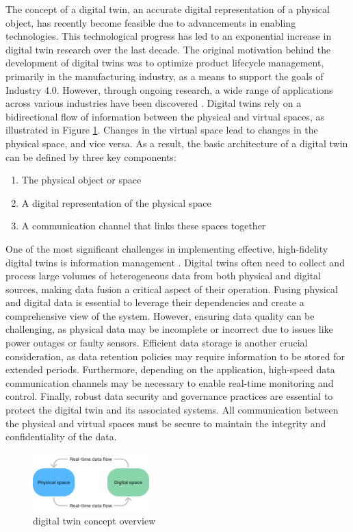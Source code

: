 \documentclass[conference]{IEEEtran}
\begin{document}
The concept of a digital twin, an accurate digital representation of a physical object, has recently become feasible due to advancements in enabling technologies. This technological progress has led to an exponential increase in digital twin research over the last decade. The original motivation behind the development of digital twins was to optimize product lifecycle management, primarily in the manufacturing industry, as a means to support the goals of Industry 4.0. However, through ongoing research, a wide range of applications across various industries have been discovered \cite{mihai_digital_2022} \cite{singh_applications_2022} \cite{b_heluany_survey_2023}.
Digital twins rely on a bidirectional flow of information between the physical and virtual spaces, as illustrated in Figure \ref{fig:digital_twin}. Changes in the virtual space lead to changes in the physical space, and vice versa. As a result, the basic architecture of a digital twin can be defined by three key components:
\begin{enumerate}
    \item The physical object or space
    \item A digital representation of the physical space
    \item A communication channel that links these spaces together
\end{enumerate}

One of the most significant challenges in implementing effective, high-fidelity digital twins is information management \cite{xiong_digital_2022} \cite{boyes_digital_2022}. Digital twins often need to collect and process large volumes of heterogeneous data from both physical and digital sources, making data fusion a critical aspect of their operation.
Fusing physical and digital data is essential to leverage their dependencies and create a comprehensive view of the system. However, ensuring data quality can be challenging, as physical data may be incomplete or incorrect due to issues like power outages or faulty sensors. Efficient data storage is another crucial consideration, as data retention policies may require information to be stored for extended periods. Furthermore, depending on the application, high-speed data communication channels may be necessary to enable real-time monitoring and control. Finally, robust data security and governance practices are essential to protect the digital twin and its associated systems. All communication between the physical and virtual spaces must be secure to maintain the integrity and confidentiality of the data.
\begin{figure}[htp]
    \centering
    \includegraphics[width=0.4\textwidth]{digital-twin.png}
    \caption{digital twin concept overview}
    \label{fig:digital_twin}
\end{figure}
\end{document}
